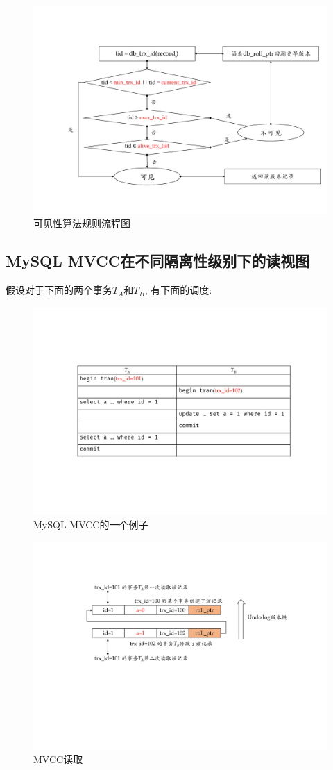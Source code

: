 \begin{figure}[H]
    \centering
    \includegraphics[width=.8\textwidth]{figure/可见性流程图.pdf}
    \caption{可见性算法规则流程图}
\end{figure}

\subsection{MySQL MVCC在不同隔离性级别下的读视图}

假设对于下面的两个事务$T_A$和$T_B$, 有下面的调度:
\begin{figure}[H]
    \centering
    \includegraphics[width=.8\textwidth]{figure/MVCC-shiwu.pdf}
    \caption{MySQL MVCC的一个例子}
\end{figure}

\begin{figure}[H]
    \centering
    \includegraphics[width=.8\textwidth]{figure/MVCC-2.pdf}
    \caption{MVCC读取}
\end{figure}


